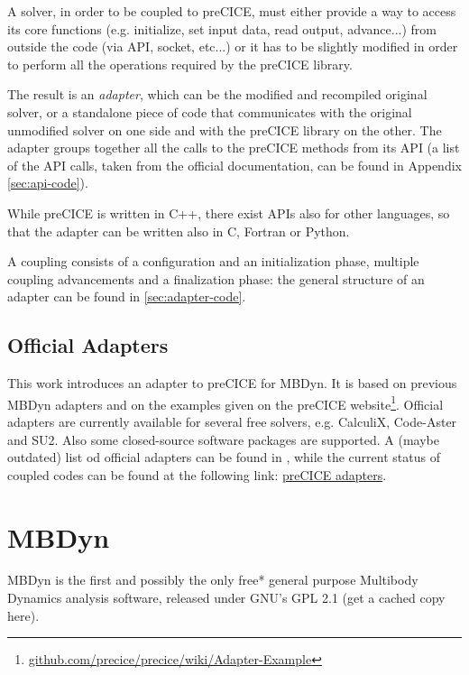 A solver, in order to be coupled to preCICE, must either provide a way to access its core functions (e.g. initialize, set input data, read output, advance...) from outside the code (via API, socket, etc...) or it has to be slightly modified in order to perform all the operations required by the preCICE library.

The result is an \textit{adapter}, which can be the modified and recompiled original solver, or a standalone piece of code that communicates with the original unmodified solver on one side and with the preCICE library on the other. The adapter groups together all the calls to the preCICE methods from its API (a list of the API calls, taken from the official documentation, can be found in Appendix \ref{sec:api-code}).

While preCICE is written in C++, there exist APIs also for other languages, so that the adapter can be written also in C, Fortran or Python.

A coupling consists of a configuration and an initialization phase, multiple coupling advancements and a finalization phase: the general structure of an adapter can be found in \ref{sec:adapter-code}.


\subsection{Official Adapters}
\label{sec:pc-adapters}


This work introduces an adapter to preCICE for MBDyn. It is based on previous MBDyn adapters and on the examples given on the preCICE website\footnote{\href{https://github.com/precice/precice/wiki/Adapter-Example}{github.com/precice/precice/wiki/Adapter-Example}}.
Official adapters are currently available for several free solvers, e.g. CalculiX, Code-Aster and SU2. Also some closed-source software packages are supported. A (maybe outdated) list od official adapters can be found in \cite{uekermann2017official}, while the current status of coupled codes can be found at the following link: \href{https://www.precice.org/codes/}{preCICE adapters}.


\section{MBDyn}
\label{sec:mbdyn}


MBDyn is the first and possibly the only free* general purpose Multibody Dynamics analysis software, released under GNU's GPL 2.1 (get a cached copy here).

